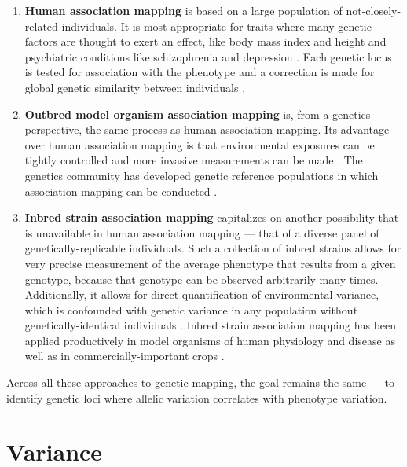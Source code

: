 \begin{enumerate}
	\item \textbf{Human association mapping} is based on a large population of not-closely-related individuals.
	It is most appropriate for traits where many genetic factors are thought to exert an effect, like body mass index \citep{Speliotes2010,Locke2015} and height \citep{Allen2010,Wood2014-fh} and psychiatric conditions like schizophrenia \citep{Ripke2014a} and depression \citep{PGC2017}.
	Each genetic locus is tested for association with the phenotype and a correction is made for global genetic similarity between individuals \citep{Lippert2011,Zhou2012}.
	\item \textbf{Outbred model organism association mapping} is, from a genetics perspective, the same process as human association mapping.
	Its advantage over human association mapping is that environmental exposures can be tightly controlled and more invasive measurements can be made \citep{Falconer1965,Lynch1998}.
	The genetics community has developed genetic reference populations in which association mapping can be conducted \citep{Ghazalpour2012b,Svenson2012a,Bogue2015}.
	\item \textbf{Inbred strain association mapping} capitalizes on another possibility that is unavailable in human association mapping --- that of a diverse panel of genetically-replicable individuals.
	Such a collection of inbred strains allows for very precise measurement of the average phenotype that results from a given genotype, because that genotype can be observed arbitrarily-many times.
	Additionally, it allows for direct quantification of environmental variance, which is confounded with genetic variance in any population without genetically-identical individuals \citep{Falconer1965,Lynch1998}.
	Inbred strain association mapping has been applied productively in model organisms of human physiology and disease \citep{TheComplexTraitConsortium2004,MacKay2012,King2012} as well as in commercially-important crops \citep{McMullen2009,Bandillo2013}.
\end{enumerate}

Across all these approaches to genetic mapping, the goal remains the same --- to identify genetic loci where allelic variation correlates with phenotype variation.

\section{Variance}


